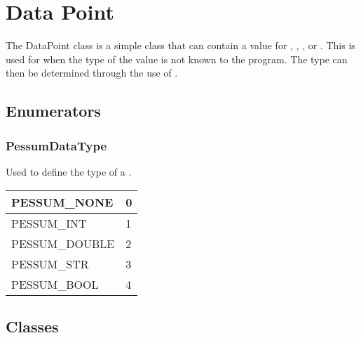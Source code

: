 \documentclass[letterpaper,10pt,english]{sphinxmanual}
\begin{document}
\chapter{Data Point}
\label{\detokenize{datapoint::doc}}\label{\detokenize{datapoint:data-point}}
The DataPoint class is a simple class that can contain a value for ,
, , or . This is used for when the type of
the value is not known to the program. The type can then be determined through
the use of .


\section{Enumerators}
\label{\detokenize{datapoint:enumerators}}

\subsection{PessumDataType}
\label{\detokenize{datapoint:pessumdatatype}}

\begin{fulllineitems}
\label{\detokenize{datapoint:_CPPv2N6pessum14PessumDataTypeE}}%
\pysigstartmultiline
{}%
\pysigstopmultiline
Used to define the type of a {\hyperref[\detokenize{datapoint:_CPPv2N6pessum9DataPointE}]{}}.


\begin{savenotes}\sphinxattablestart
\centering
\begin{tabulary}{\linewidth}[t]{|T|T|}
\hline

PESSUM\_NONE
&
0
\\
\hline
PESSUM\_INT
&
1
\\
\hline
PESSUM\_DOUBLE
&
2
\\
\hline
PESSUM\_STR
&
3
\\
\hline
PESSUM\_BOOL
&
4
\\
\hline
\end{tabulary}
\par
\sphinxattableend\end{savenotes}

\end{fulllineitems}



\section{Classes}
\label{\detokenize{datapoint:classes}}
\end{document}
